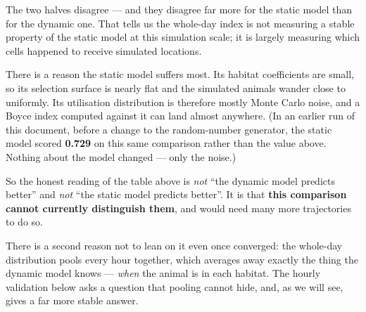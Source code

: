\documentclass[
  letterpaper,
  DIV=11,
  numbers=noendperiod]{scrartcl}
\begin{document}
\begin{tcolorbox}[enhanced jigsaw, arc=.35mm, bottomrule=.15mm, bottomtitle=1mm, breakable, colback=white, colbacktitle=quarto-callout-important-color!10!white, colframe=quarto-callout-important-color-frame, coltitle=black, left=2mm, leftrule=.75mm, opacityback=0, opacitybacktitle=0.6, rightrule=.15mm, title=\textcolor{quarto-callout-important-color}{\faExclamation}\hspace{0.5em}{Do not read the whole-day comparison as a result}, titlerule=0mm, toprule=.15mm, toptitle=1mm]

The two halves disagree --- and they disagree far more for the static
model than for the dynamic one. That tells us the whole-day index is not
measuring a stable property of the static model at this simulation
scale; it is largely measuring which cells happened to receive simulated
locations.

There is a reason the static model suffers most. Its habitat
coefficients are small, so its selection surface is nearly flat and the
simulated animals wander close to uniformly. Its utilisation
distribution is therefore mostly Monte Carlo noise, and a Boyce index
computed against it can land almost anywhere. (In an earlier run of this
document, before a change to the random-number generator, the static
model scored \textbf{0.729} on this same comparison rather than the
value above. Nothing about the model changed --- only the noise.)

So the honest reading of the table above is \emph{not} ``the dynamic
model predicts better'' and \emph{not} ``the static model predicts
better''. It is that \textbf{this comparison cannot currently
distinguish them}, and would need many more trajectories to do so.

There is a second reason not to lean on it even once converged: the
whole-day distribution pools every hour together, which averages away
exactly the thing the dynamic model knows --- \emph{when} the animal is
in each habitat. The hourly validation below asks a question that
pooling cannot hide, and, as we will see, gives a far more stable
answer.

\end{tcolorbox}
\end{document}
